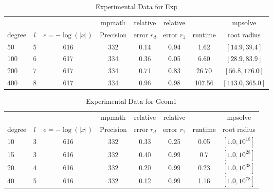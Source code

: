 \documentclass[sigconf]{acmart}
\begin{document}
\begin{table}[t]
\caption{Experimental Data for Exp}
\label{tab:exp}
\vskip 0.15in
\begin{center}
\begin{small}
\begin{sc}
\begin{tabular}{lccccccc}
\toprule
&  &  & mpmath & relative  & relative &  & mpsolve \\
degree  & $l$& $e=-\log(|x|)$& Precision &error $r_d$       & error $r_1$ &runtime& root radius\\
\midrule
   50 & 5 & 616 & 332 & 0.14 & 0.94 & 1.62 & $[14.9, 39.4]$ \\
 100 & 6 & 617 & 334 & 0.36 & 0.05 & 6.60 & $[28.9, 83.9]$\\
 200 & 7 & 617 & 334 & 0.71 & 0.83 & 26.70 & $[56.8, 176.0]$\\
 400 & 8 & 617 & 334 & 0.96 & 0.98 & 107.56 & $[113.0, 365.0]$\\
\bottomrule
\end{tabular}
\end{sc}
\end{small}
\end{center}
\vskip -0.1in
\end{table}

\begin{table}[t]
\caption{Experimental Data for Geom1}
\label{tab:geom1}
\vskip 0.15in
\begin{center}
\begin{small}
\begin{sc}
\begin{tabular}{lccccccc}
\toprule
&  &  & mpmath & relative  & relative &  & mpsolve \\
degree  & $l$& $e=-\log(|x|)$& Precision &error $r_d$       & error $r_1$ &runtime& root radius\\
\midrule
   10 & 3 & 616 & 332 & 0.33 & 0.25 & 0.05 & $[1.0, 10^{18}]$ \\
   15 & 3 & 616 & 332 & 0.40 & 0.99 & 0.7 & $[1.0, 10^{28}]$\\
   20 & 4 & 616 & 332 & 0.20 & 0.99 & 0.23 & $[1.0, 10^{38}]$\\
   40 & 5 & 616 & 332 & 0.12 & 0.99 & 1.16 & $[1.0, 10^{78}]$\\
\bottomrule
\end{tabular}
\end{sc}
\end{small}
\end{center}
\vskip -0.1in
\end{table}
\end{document}
